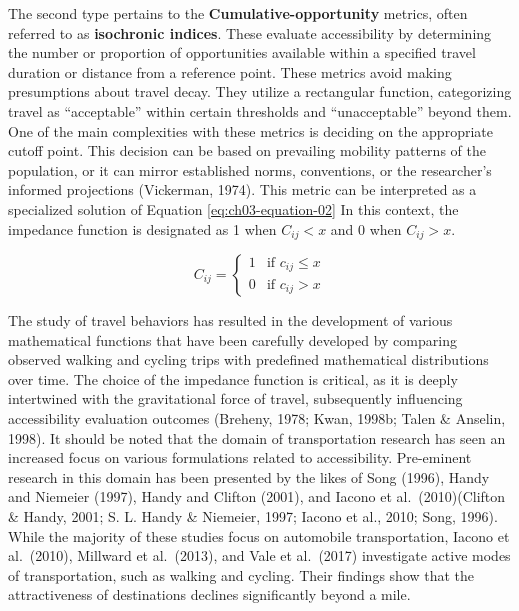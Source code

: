 \documentclass[
11pt, %
oneside, %
english, %
singlespacing, %
]{macthesis} %
\begin{document}
The second type pertains to the \textbf{Cumulative-opportunity} metrics, often referred to as \textbf{isochronic indices}. These evaluate accessibility by determining the number or proportion of opportunities available within a specified travel duration or distance from a reference point. These metrics avoid making presumptions about travel decay. They utilize a rectangular function, categorizing travel as ``acceptable'' within certain thresholds and ``unacceptable'' beyond them. One of the main complexities with these metrics is deciding on the appropriate cutoff point. This decision can be based on prevailing mobility patterns of the population, or it can mirror established norms, conventions, or the researcher's informed projections (Vickerman, 1974). This metric can be interpreted as a specialized solution of Equation \ref{eq:ch03-equation-02} In this context, the impedance function is designated as 1 when \(C_{ij}< x\) and 0 when \(C_{ij} > x\).

\begin{equation}
C_{ij} =
\begin{cases}
  1 & \text{if } c_{ij} \le x \\
  0 & \text{if } c_{ij} > x
\end{cases}
\label{eq:ch03-equation-02}
\end{equation}

The study of travel behaviors has resulted in the development of various mathematical functions that have been carefully developed by comparing observed walking and cycling trips with predefined mathematical distributions over time. The choice of the impedance function is critical, as it is deeply intertwined with the gravitational force of travel, subsequently influencing accessibility evaluation outcomes (Breheny, 1978; Kwan, 1998b; Talen \& Anselin, 1998). It should be noted that the domain of transportation research has seen an increased focus on various formulations related to accessibility. Pre-eminent research in this domain has been presented by the likes of Song (1996), Handy and Niemeier (1997), Handy and Clifton (2001), and Iacono et al.~(2010)(Clifton \& Handy, 2001; S. L. Handy \& Niemeier, 1997; Iacono et al., 2010; Song, 1996). While the majority of these studies focus on automobile transportation, Iacono et al.~(2010), Millward et al.~(2013), and Vale et al.~(2017) investigate active modes of transportation, such as walking and cycling. Their findings show that the attractiveness of destinations declines significantly beyond a mile.
\end{document}
